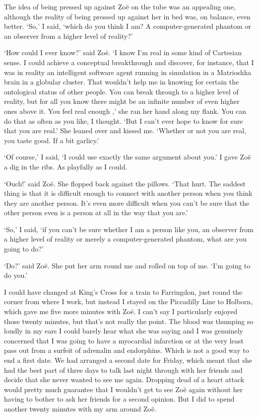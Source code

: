 The idea of being pressed up against Zoë on the tube was an
appealing one, although the reality of being pressed up against her
in bed was, on balance, even better. `So,' I said, `which do you
think I am? A computer-generated phantom or an observer from a
higher level of reality?'

`How could I ever know?' said Zoë. `I know I'm real in some kind
of Cartesian sense. I could achieve a conceptual breakthrough and
discover, for instance, that I was in reality an intelligent software
agent running in simulation in a Matrioshka brain in a globular
cluster. That wouldn't help me in knowing for
certain the ontological status of other people. You can break
through to a higher level of reality, but for all you know there
might be an infinite number of even higher ones above it. You {\twelveit feel\/} real enough ,' she ran her hand along
my flank. You can do that as often as you like, I thought. `But I
can't ever hope to know for sure that you are real.' She leaned over
and kissed me. `Whether or not you are real, you taste good. If
a bit garlicy.'

`Of course,' I said, `{\twelveit I\/} could use exactly the same
argument about {\twelveit you}.' I gave Zoë a dig in the ribs.
As playfully as I could.

`Ouch!' said Zoë. She flopped back against the pillows. `That
hurt. The saddest thing is that it is difficult enough to connect
with another person when you think they are another person. It's
even more difficult when you can't be sure that the other person
even {\twelveit is\/} a person at all in the way that you are.'

`So,' I said, `if you can't be sure whether I am a person like you,
an observer from a higher level of reality or merely a
computer-generated phantom, what are you going to do?'

`Do?' said Zoë. She put her arm round me and rolled on top of
me. `I'm going to do you.'

\vskip 1cm

I could have changed at King's Cross for a train to Farringdon, just
round the corner from where I work, but instead I stayed on the
Piccadilly Line to Holborn, which gave me five more minutes with
Zoë. I can't say I particularly enjoyed those twenty minutes,
but that's not really the point. The blood was thumping so loudly in
my ears I could barely hear what she was saying and I was genuinely
concerned that I was going to have a myocardial infarction or at the
very least pass out from a surfeit of adrenalin and endorphins.
Which is not a good way to end a first date. We had arranged a
second date for Friday, which meant that she had the best part of
three days to talk last night through with her friends and decide
that she never wanted to see me again. Dropping dead of a heart
attack would pretty much guarantee that I wouldn't get to see
Zoë again without her having to bother to ask her friends for a
second opinion. But I did to spend another twenty minutes with my arm around
Zoë.

